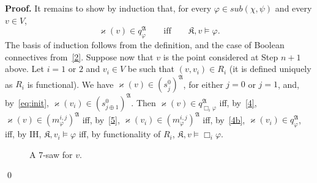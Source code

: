 \documentclass{LMCS}
\renewenvironment{proof}{\par\noindent\textbf{Proof.}}{\mbox{}\qed\par\medskip}
\theoremstyle{plain}
\begin{document}
\begin{proof}
It remains to show by induction that, for every $\varphi\in
\mathit{sub}(\chi,\psi)$ and every $v \in V$,
\begin{equation*}
\varkappa(v) \in q_{\varphi}^{\mathfrak A} \qquad \text{iff} \qquad \mathfrak K, v \models \varphi.
\end{equation*}
The basis of induction follows from the definition, and the case of
Boolean connectives from~\eqref{2}. Suppose now that $v$ is the point
considered at Step $n+1$ above. Let $i = 1$ or $2$ and $v_i\in V$ be
such that $(v,v_i)\in R_i$ (it is defined uniquely as $R_i$ is
functional). We have $\varkappa(v) \in (s_j^0)^{\mathfrak A}$, for
either $j = 0$ or $j=1$, and, by~\eqref{eq:init}, $\varkappa(v_i)\in
(s_{j\oplus 1}^0)^{\mathfrak A}$. Then $\varkappa(v) \in
q_{\Box_i\varphi}^{\mathfrak A}$ iff, by~\eqref{4}, $\varkappa(v) \in
(m_{\varphi}^{i,j})^{\mathfrak A}$ iff, by~\eqref{5}, $\varkappa(v_i)
\in (m_{\varphi}^{i,j})^{\mathfrak A}$ iff, by~\eqref{4b},
$\varkappa(v_i) \in q_{\varphi}^{\mathfrak A}$, iff, by IH, $\mathfrak
K, v_i \models \varphi$ iff, by functionality of $R_i$, $\mathfrak K,
v \models \Box_i\varphi$.

\bigskip

\begin{figure}[t]
\setlength{\unitlength}{0.8mm}
\caption{A 7-saw for $v$.}\label{f:7-saw}
\end{figure}


\end{proof}
\end{document}
